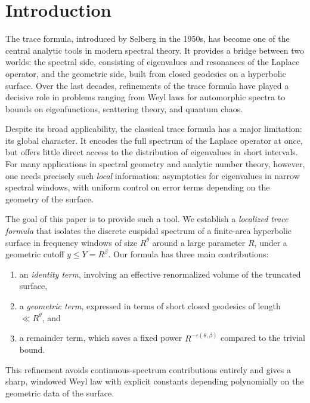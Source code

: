 \section{Introduction}
\label{sec:intro}

The trace formula, introduced by Selberg in the 1950s, has become one of the central analytic tools in modern spectral theory. 
It provides a bridge between two worlds: the spectral side, consisting of eigenvalues and resonances of the Laplace operator, 
and the geometric side, built from closed geodesics on a hyperbolic surface. 
Over the last decades, refinements of the trace formula have played a decisive role in problems ranging from 
Weyl laws for automorphic spectra to bounds on eigenfunctions, scattering theory, and quantum chaos.

Despite its broad applicability, the classical trace formula has a major limitation: 
its global character. It encodes the full spectrum of the Laplace operator at once, 
but offers little direct access to the distribution of eigenvalues in short intervals. 
For many applications in spectral geometry and analytic number theory, however, 
one needs precisely such \emph{local} information: asymptotics for eigenvalues 
in narrow spectral windows, with uniform control on error terms depending on the geometry of the surface. 

The goal of this paper is to provide such a tool. 
We establish a \emph{localized trace formula} that isolates the discrete cuspidal spectrum 
of a finite-area hyperbolic surface in frequency windows of size $R^\theta$ around a large parameter $R$, 
under a geometric cutoff $y \leq Y = R^\beta$. 
Our formula has three main contributions:
\begin{enumerate}
  \item an \emph{identity term}, involving an effective renormalized volume of the truncated surface,
  \item a \emph{geometric term}, expressed in terms of short closed geodesics of length $\ll R^\theta$, and
  \item a remainder term, which saves a fixed power $R^{-\varepsilon(\theta,\beta)}$ compared to the trivial bound. 
\end{enumerate}
This refinement avoids continuous-spectrum contributions entirely and gives a sharp, windowed Weyl law with explicit constants depending polynomially on the geometric data of the surface.

